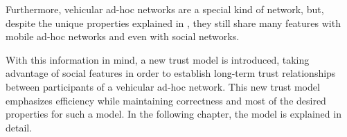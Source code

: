 Furthermore, vehicular ad-hoc networks are a special kind of network, but, despite the unique properties explained in , they still share many features with mobile ad-hoc networks and even with social networks.

With this information in mind, a new trust model is introduced, taking advantage of social features in order to establish long-term trust relationships between participants of a vehicular ad-hoc network.
This new trust model emphasizes efficiency while maintaining correctness and most of the desired properties for such a model.
In the following chapter, the model is explained in detail.




